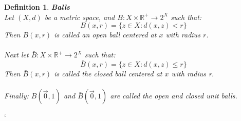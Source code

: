 \documentclass[12pt]{extarticle}
\theoremstyle{plain}
\theoremstyle{Definition}
\newtheorem{def.}{Definition}[section]
\theoremstyle{Definition}
\theoremstyle{plain}
\begin{document}
	\begin{def.} \textbf{Balls} \\
		Let $(X,d)$ be a metric space, and $B : X \times \mathbb{R}^+ \to 2^{X}$ such that:
		$$B(x,r) = \{z \in X : d(x,z) < r\}$$
		Then $B(x,r)$ is called an open ball centered at $x$ with radius $r$. \\ \\
		Next let $\bar{B} : X \times \mathbb{R}^+ \to 2^X$ such that: 
		$$\bar{B}(x,r) = \{z \in X : d(x,z) \leq r\}$$
		Then $\bar{B}(x,r)$ is called the closed ball centered at $x$ with radius r. \\ \\
		Finally: $B(\vec{0},1)$ and $\bar{B}(\vec{0},1)$ are called the open and closed unit balls.  
	\end{def.}
	`
\end{document}
